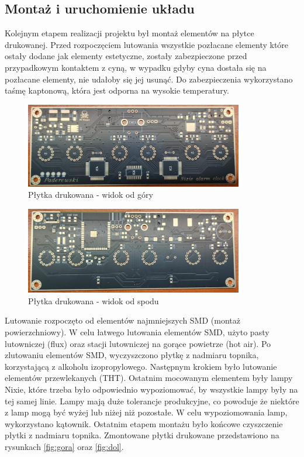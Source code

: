 \documentclass[../main.tex]{subfiles}
\begin{document}
\subsection{Montaż i uruchomienie układu}
Kolejnym etapem realizacji projektu był montaż elementów na płytce drukowanej.
Przed rozpoczęciem lutowania wszystkie pozłacane elementy
które ostały dodane jak elementy estetyczne, zostały zabezpieczone przed przypadkowym kontaktem z cyną, w wypadku gdyby cyna dostała się
na pozłacane elementy, nie udałoby się jej usunąć. Do zabezpieczenia wykorzystano taśmę kaptonową, która jest odporna na wysokie temperatury.

\begin{figure}[H]
    \centering
    \includegraphics[width=0.85\textwidth]{przod.jpeg}
    \caption{Płytka drukowana - widok od góry}
    \label{fig:plytka_drukowana_1}
\end{figure}

\begin{figure}[H]
    \centering
    \includegraphics[width=0.85\textwidth]{tyl.jpeg}
    \caption{Płytka drukowana - widok od spodu}
    \label{fig:plytka_drukowana_2}
\end{figure}


Lutowanie rozpoczęto od elementów najmniejszych SMD (montaż powierzchniowy). W celu łatwego lutowania elementów SMD, użyto pasty lutowniczej (flux)
oraz stacji lutowniczej na gorące powietrze (hot air). Po zlutowaniu elementów SMD, wyczyszczono płytkę z nadmiaru topnika, korzystającą z alkoholu izopropylowego. Następnym
krokiem było lutowanie elementów przewlekanych (THT). Ostatnim  mocowanym elementem były lampy Nixie, które trzeba było odpowiednio wypoziomować, by wszystkie lampy
były na tej samej linie. Lampy mają duże tolerancje produkcyjne, co powoduje że niektóre z lamp mogą być wyżej lub niżej niż pozostałe. W celu wypoziomowania lamp,
wykorzystano kątownik. Ostatnim etapem montażu było końcowe czyszczenie płytki z nadmiaru topnika. Zmontowane płytki drukowane przedstawiono na rysunkach \ref{fig:gora} oraz \ref{fig:dol}.
\end{document}

